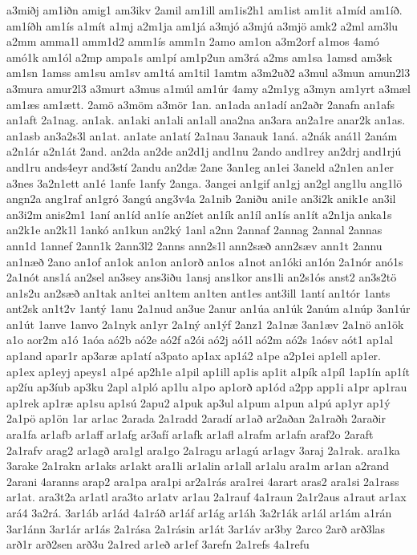 {a3miðj
am1iðn
amig1
am3ikv
2amil
am1ill
am1is2h1
am1ist
am1it
a1míd
am1íð.
am1íðh
am1ís
a1mít
a1mj
a2m1ja
am1já
a3mjó
a3mjú
a3mjö
amk2
a2ml
am3lu
a2mm
amma1l
amm1d2
amm1ís
amm1n
2amo
am1on
a3m2orf
a1mos
4amó
amó1k
am1ól
a2mp
ampa1s
am1pí
am1p2un
am3rá
a2ms
am1sa
1amsd
am3sk
am1sn
1amss
am1su
am1sv
am1tá
am1til
1amtm
a3m2uð2
a3mul
a3mun
amun2l3
a3mura
amur2l3
a3murt
a3mus
a1múl
am1úr
4amy
a2m1yg
a3myn
am1yrt
a3mæl
am1æs
am1ætt.
2amö
a3möm
a3mör
1an.
an1ada
an1adí
an2aðr
2anafn
an1afs
an1aft
2a1nag.
an1ak.
an1aki
an1ali
an1all
ana2na
an3ara
an2a1re
anar2k
an1as.
an1asb
an3a2s3l
an1at.
an1ate
an1atí
2a1nau
3anauk
1aná.
a2nák
aná1l
2anám
a2n1ár
a2n1át
2and.
an2da
an2de
an2d1j
and1nu
2ando
and1rey
an2drj
and1rjú
and1ru
ands4eyr
and3stí
2andu
an2dæ
2ane
3an1eg
an1ei
3aneld
a2n1en
an1er
a3nes
3a2n1ett
an1é
1anfe
1anfy
2anga.
3angei
an1gif
an1gj
an2gl
ang1lu
ang1lö
angn2a
ang1raf
an1gró
3angú
ang3v4a
2a1nib
2aniðu
ani1e
an3i2k
anik1e
an3il
an3i2m
anis2m1
1aní
an1íd
an1íe
an2íet
an1ík
an1íl
an1ís
an1ít
a2n1ja
anka1s
an2k1e
an2k1l
1ankó
an1kun
an2ký
1anl
a2nn
2annaf
2annag
2annal
2annas
ann1d
1annef
2ann1k
2ann3l2
2anns
ann2s1l
ann2sæð
ann2sæv
ann1t
2annu
an1næð
2ano
an1of
an1ok
an1on
an1orð
an1os
a1not
an1óki
an1ón
2a1nór
anó1s
2a1nót
ans1á
an2sel
an3sey
ans3iðu
1ansj
ans1kor
ans1li
an2s1ós
anst2
an3s2tö
an1s2u
an2sæð
an1tak
an1tei
an1tem
an1ten
ant1es
ant3ill
1antí
an1tór
1ants
ant2sk
an1t2v
1antý
1anu
2a1nud
an3ue
2anur
an1úa
an1úk
2anúm
a1núp
3an1úr
an1út
1anve
1anvo
2a1nyk
an1yr
2a1ný
an1ýf
2anz1
2a1næ
3an1æv
2a1nö
an1ök
a1o
aor2m
a1ó
1aóa
aó2b
aó2e
aó2f
a2ói
aó2j
aó1l
aó2m
aó2s
1aósv
aót1
ap1al
ap1and
apar1r
ap3aræ
ap1atí
a3pato
ap1ax
ap1á2
a1pe
a2p1ei
ap1ell
ap1er.
ap1ex
ap1eyj
apeys1
a1pé
ap2h1e
a1pil
ap1ill
ap1is
ap1it
a1pík
a1píl
1ap1ín
ap1ít
ap2íu
ap3íub
ap3ku
2apl
a1pló
ap1lu
a1po
ap1orð
ap1ód
a2pp
app1i
a1pr
ap1rau
ap1rek
ap1ræ
ap1su
ap1sú
2apu2
a1puk
ap3ul
a1pum
a1pun
a1pú
ap1yr
ap1ý
2a1pö
ap1ön
1ar
ar1ac
2arada
2a1radd
2aradí
ar1að
ar2aðan
2a1raðh
2araðir
ara1fa
ar1afb
ar1aff
ar1afg
ar3afí
ar1afk
ar1afl
a1rafm
ar1afn
araf2o
2araft
2a1rafv
arag2
ar1agð
ara1gl
ara1go
2a1ragu
ar1agú
ar1agv
3araj
2a1rak.
ara1ka
3arake
2a1rakn
ar1aks
ar1akt
ara1li
ar1alin
ar1all
ar1alu
ara1m
ar1an
a2rand
2arani
4aranns
arap2
ara1pa
ara1pi
ar2a1rás
ara1rei
4arart
aras2
ara1si
2a1rass
ar1at.
ara3t2a
ar1atl
ara3to
ar1atv
ar1au
2a1rauf
4a1raun
2a1r2aus
a1raut
ar1ax
ará4
3a2rá.
3ar1áb
ar1ád
4a1ráð
ar1áf
ar1ág
ar1áh
3a2r1ák
ar1ál
ar1ám
a1rán
3ar1ánn
3ar1ár
ar1ás
2a1rása
2a1rásin
ar1át
3ar1áv
ar3by
2arco
2arð
arð3las
arð1r
arð2sen
arð3u
2a1red
ar1eð
ar1ef
3arefn
2a1refs
4a1refu
}
